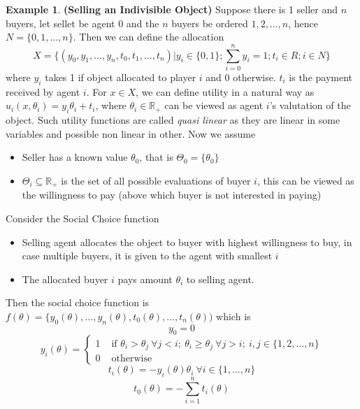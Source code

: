 \documentclass{article}
\theoremstyle{definition}
\newtheorem{example}{Example}[section]
\begin{document}
\begin{example}
\textbf{(Selling an Indivisible Object)} Suppose there is 1 seller and $n$ buyers, let sellet be agent $0$ and the $n$ buyers be ordered $1,2,\dots,n$, hence $N = \{0,1,\dots,n\}$. Then we can define the allocation $$X = \{(y_0,y_1,\dots,y_n,t_0,t_1,\dots,t_n)| y_i \in \{0,1\}; \sum_{i=0}^n y_i = 1; t_i \in R; i \in N\}$$ where $y_i$ takes 1 if object allocated to player $i$ and $0$ otherwise. $t_i$ is the payment received by agent $i$. For $x \in X$, we can define utility in a natural way as $u_i(x,\theta_i) = y_i\theta_i + t_i$, where $\theta_i \in \mathbb{R}_+$ can be viewed as agent $i$'s valutation of the object. Such utility functions are called \textit{quasi linear} as they are linear in some variables and possible non linear in other. Now we assume 
\begin{itemize}
	\item Seller has a known value $\theta_0$, that is $\Theta_0 = \{\theta_0\}$
	\item $\Theta_i \subseteq \mathbb{R}_+$ is the set of all possible evaluations of buyer $i$, this can be viewed as the willingness to pay (above which buyer is not interested in paying)
\end{itemize}
Consider the Social Choice function
\begin{itemize}
	\item Selling agent allocates the object to buyer with highest willingness to buy, in case multiple buyers, it is given to the agent with smallest $i$
	\item The allocated buyer $i$ pays amount $\theta_i$ to selling agent.
\end{itemize}
Then the social choice function is $f(\theta) = \{y_0(\theta),\dots,y_n(\theta),t_0(\theta),\dots,t_n(\theta))$ which is 
$$y_0 = 0$$
$$y_i(\theta) = 
\begin{cases}
1 & \text{ if } \theta_i > \theta_j~\forall j<i; ~ \theta_i\geq \theta_j ~\forall j>i;~i,j \in \{1,2,\dots,n\}\\
0 & \text{ otherwise }
\end{cases}$$
$$t_i(\theta) = -y_i(\theta)\theta_i~\forall i \in \{1,\dots,n\}$$
$$t_0(\theta) = -\sum_{i=1}^n t_i(\theta)$$
\end{example}
\end{document}

